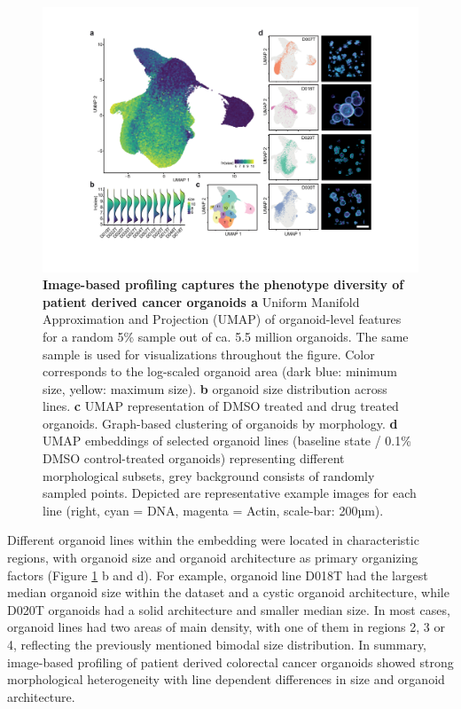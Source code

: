 \begin{flushleft}
\clearpage

\begin{figure}[h]
\centering
\includegraphics[width=\textwidth,
                height=\textheight,
                keepaspectratio]{figures/promise/pdf/fig_1_4.pdf}
\caption{\textbf{Image-based profiling captures the phenotype diversity of patient derived cancer organoids a} Uniform Manifold Approximation and Projection (UMAP) of organoid-level features for a random 5\% sample out of ca. 5.5 million organoids. The same sample is used for visualizations throughout the figure. Color corresponds to the log-scaled organoid area (dark blue: minimum size, yellow: maximum size). \textbf{b} organoid size distribution across lines. \textbf{c} UMAP representation of DMSO treated and drug treated organoids. Graph-based clustering of organoids by morphology. \textbf{d} UMAP embeddings of selected organoid lines (baseline state / 0.1\% DMSO control-treated organoids) representing different morphological subsets, grey background consists of randomly sampled points. Depicted are representative example images for each line (right, cyan = DNA, magenta = Actin, scale-bar: 200µm).}
\label{fig_140}
\end{figure}

Different organoid lines within the embedding were located in characteristic regions, with organoid size and organoid architecture as primary organizing factors (Figure \ref{fig_140} b and d). For example, organoid line D018T had the largest median organoid size within the dataset and a cystic organoid architecture, while D020T organoids had a solid architecture and smaller median size. In most cases, organoid lines had two areas of main density, with one of them in regions 2, 3 or 4, reflecting the previously mentioned bimodal size distribution. In summary, image-based profiling of patient derived colorectal cancer organoids showed strong morphological heterogeneity with line dependent differences in size and organoid architecture.


\end{flushleft}
